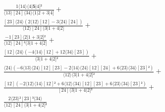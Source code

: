 \documentclass[varwidth, border=5pt]{standalone}
\begin{document}
\begin{my}
$\begin{gathered}
\scriptscriptstyle\frac{1⟨14⟩⟨4|𝟓|4]²}{⟨13⟩[24]⟨34⟩⟨1|2+3|4]} +\\
\scriptscriptstyle\frac{[23]⟨24⟩(2⟨12⟩[12]-3⟨24⟩[24])}{⟨12⟩[24]⟨3|1+4|2]} +\\
\scriptscriptstyle\frac{-1[23]⟨2|1+3|2]²}{⟨12⟩[24]²⟨3|1+4|2]} +\\
\scriptscriptstyle\frac{[12]⟨24⟩(-4⟨14⟩[12]+12⟨34⟩[23])}{⟨3|1+4|2]²} +\\
\scriptscriptstyle\frac{⟨24⟩(-6⟨13⟩⟨24⟩[12][23]-2⟨14⟩⟨24⟩[12][24]+6⟨23⟩⟨34⟩[23]²)}{⟨12⟩⟨3|1+4|2]²} +\\
\scriptscriptstyle\frac{[12](-2⟨12⟩⟨14⟩[12]²+6⟨12⟩⟨34⟩[12][23]+6⟨23⟩⟨34⟩[23]²)}{[24]⟨3|1+4|2]²} +\\
\scriptscriptstyle\frac{2⟨23⟩²[23]³⟨34⟩}{⟨12⟩[24]⟨3|1+4|2]²} \phantom{+}
\end{gathered}$
\end{my}
\end{document}
